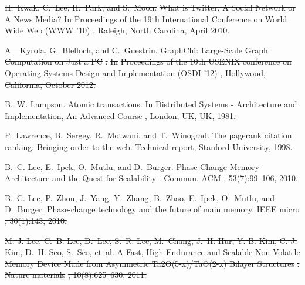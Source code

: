 \documentclass[sigconf]{acmart}
\renewcommand{\em}{\it}
\providecommand{\DIFdel}[1]{{\protect\color{red}\sout{#1}}}                      %
\begin{document}
{%
\DIFdel{H.~Kwak, C.~Lee, H.~Park, and S.~Moon.
}%
\DIFdel{What is Twitter, A Social Network or A News Media?}%
\DIFdel{In }%
\DIFdel{Proceedings of the 19th International Conference on World
  Wide Web (WWW ’10)}%
\DIFdel{, Raleigh, North Carolina, April 2010.
}%

\DIFdel{A.
~Kyrola, G.~Blelloch, and C.~Guestrin.
}%
\DIFdel{GraphChi: Large-Scale Graph Computation on Just a PC}%
\DIFdel{.
}%
\DIFdel{In }%
\DIFdel{Proceedings of the 10th USENIX conference on Operating
  Systems Design and Implementation (OSDI ’12)}%
\DIFdel{, Hollywood, California,
  October 2012.
}%

\DIFdel{B.~W. Lampson.
}%
\DIFdel{Atomic transactions.
}%
\DIFdel{In }%
\DIFdel{Distributed Systems - Architecture and Implementation, An
  Advanced Course}%
\DIFdel{, London, UK, UK, 1981.
}%

\DIFdel{P.~Lawrence, B.~Sergey, R.~Motwani, and T.~Winograd.
}%
\DIFdel{The pagerank citation ranking: Bringing order to the web.
}%
\DIFdel{Technical report, Stanford University, 1998.
}%

\DIFdel{B.~C. Lee, E.~Ipek, O.~Mutlu, and D.~Burger.
}%
\DIFdel{Phase Change Memory Architecture and the Quest for Scalability}%
\DIFdel{.
}%
\DIFdel{Commun. ACM}%
\DIFdel{, 53(7):99--106, 2010.
}%

\DIFdel{B.~C. Lee, P.~Zhou, J.~Yang, Y.~Zhang, B.~Zhao, E.~Ipek, O.~Mutlu, and
  D.~Burger.
}%
\DIFdel{Phase-change technology and the future of main memory.
}%
\DIFdel{IEEE micro}%
\DIFdel{, 30(1):143, 2010.
}%

\DIFdel{M.-J. Lee, C.~B. Lee, D.~Lee, S.~R. Lee, M.~Chang, J.~H. Hur, Y.-B. Kim, C.-J.
  Kim, D.~H. Seo, S.~Seo, et~al.
}%
\DIFdel{A Fast, High-Endurance and Scalable Non-Volatile Memory Device Made
  from Asymmetric Ta2O(5-x)/TaO(2-x) Bilayer Structures}%
\DIFdel{.
}%
\DIFdel{Nature materials}%
\DIFdel{, 10(8):625--630, 2011.
}%

}
\end{document}
